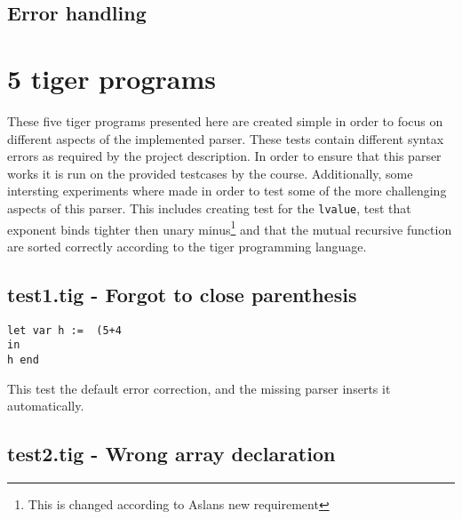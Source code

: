 \documentclass{article}
\begin{document}
\subsection{Error handling}

\section{5 tiger programs}


These five tiger programs presented here are created simple in order to focus on different aspects of the implemented parser. These tests contain different syntax errors as required by the project description. In order to ensure that this parser works it is run on the provided testcases by the course. Additionally, some intersting experiments where made in order to test some of the more challenging aspects of this parser. This includes creating test for the \texttt{lvalue}, test that exponent binds tighter then unary minus\footnote{This is changed according to Aslans new requirement} and that the mutual recursive function are sorted correctly according to the tiger programming language.

\subsection{test1.tig - Forgot to close parenthesis}
\begin{lstlisting}[frame=single]
let var h :=  (5+4
in
h end
\end{lstlisting}

This test the default error correction, and the missing parser inserts it automatically.


\subsection{test2.tig - Wrong array declaration}

\end{document}
